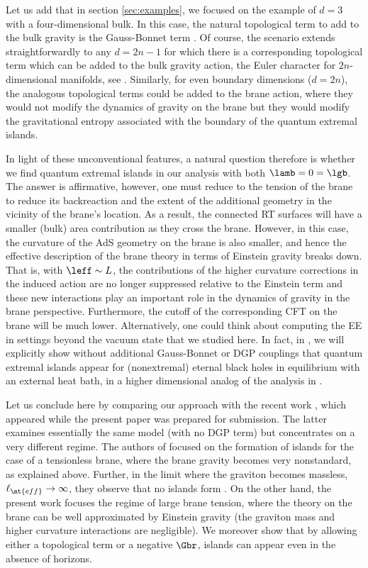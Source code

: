 Let us add that in section \ref{sec:examples}, we focused on the example of $d=3$ with a four-dimensional bulk. In this case, the natural topological term to add to the bulk gravity is the Gauss-Bonnet term . Of course, the scenario extends straightforwardly to any $d=2n-1$ for which there is a corresponding topological term which can be added to the bulk gravity action, \ie the Euler character for $2n$-dimensional manifolds, \eg see \cite{Hung:2011xb}. Similarly, for even boundary dimensions ($d=2n$), the analogous topological terms could be added to the brane action, where they would not modify the dynamics of gravity on the brane but they would modify the gravitational entropy associated with the boundary of the quantum extremal islands. 

In light of these unconventional features, a natural question therefore is whether we find quantum extremal islands in our analysis with both $\lamb =0= \lgb$. The answer is affirmative, however, one must reduce to the tension of the brane to reduce its backreaction and the extent of the additional geometry in the vicinity of the  brane's location. As a result, the connected RT surfaces will have a smaller (bulk) area contribution as they cross the brane. However, in this case, the curvature of the AdS geometry on the brane is also smaller, and hence the effective description of the brane theory in terms of Einstein gravity breaks down. That is, with $\leff\sim L$, the contributions of the higher curvature corrections in the induced action  are no longer suppressed relative to the Einstein term and these new interactions play an important role in the dynamics of gravity in the brane perspective. Furthermore, the cutoff of the corresponding CFT on the brane will be much lower. Alternatively, one could think about computing the EE in settings beyond the vacuum state that we studied here. In fact, in \cite{QEI}, we will explicitly show without additional Gauss-Bonnet or DGP couplings that quantum extremal islands appear for (nonextremal) eternal black holes in equilibrium with an external heat bath, \ie in a higher dimensional analog of the analysis in \cite{Almheiri:2019yqk}.

Let us conclude here by comparing our approach with the recent work \cite{Geng:2020qvw}, which appeared while the present paper was prepared for submission. The latter examines essentially the same model (with no DGP term) but concentrates on a very different regime. The authors of \cite{Geng:2020qvw} focused on the formation of islands for the case of a tensionless brane, where the brane gravity becomes very nonstandard, as explained above. Further, in the limit where the graviton becomes massless, \ie $\ell_\mt{eff}\to \infty$, they  observe that no islands form \cite{Geng:2020qvw}. On the other hand, the present work focuses the regime of large brane tension, where the theory on the brane can be well approximated by Einstein gravity (\ie the graviton mass and higher curvature interactions are negligible). We moreover show that by allowing either a topological term or a negative $\Gbr$, islands can appear even in the absence of horizons.\\ 

